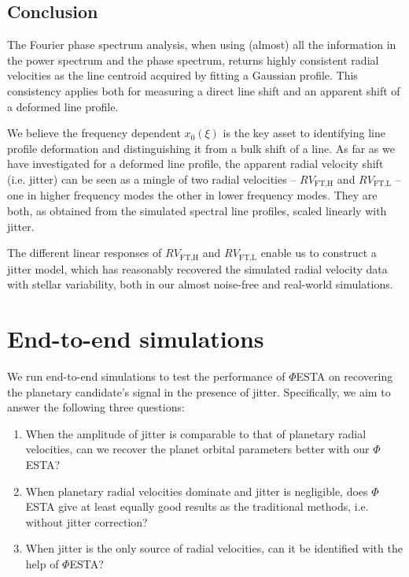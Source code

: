 \subsection{Conclusion}

The Fourier phase spectrum analysis, when using (almost) all the information in the power spectrum and the phase spectrum, returns highly consistent radial velocities as the line centroid acquired by fitting a Gaussian profile. This consistency applies both for measuring a direct line shift and an apparent shift of a deformed line profile. 

We believe the frequency dependent $x_0(\xi)$ is the key asset to identifying line profile deformation and distinguishing it from a bulk shift of a line. As far as we have investigated for a deformed line profile, the apparent radial velocity shift (i.e. jitter) can be seen as a mingle of two radial velocities -- $RV_\text{FT,H}$ and $RV_\text{FT,L}$ -- one in higher frequency modes the other in lower frequency modes. They are both, as obtained from the simulated spectral line profiles, scaled linearly with jitter. 

The different linear responses of $RV_\text{FT,H}$ and $RV_\text{FT,L}$ enable us to construct a jitter model, which has reasonably recovered the simulated radial velocity data with stellar variability, both in our almost noise-free and real-world simulations. 

\pagebreak
\section{End-to-end simulations}
\label{\thesection}
\label{sec:end-to-end}

We run end-to-end simulations to test the performance of $\mathit{\Phi}$ESTA on recovering the planetary candidate's signal in the presence of jitter. Specifically, we aim to answer the following three questions:
\begin{enumerate}
	\item When the amplitude of jitter is comparable to that of planetary radial velocities, can we recover the planet orbital parameters better with our $\mathit{\Phi}$ESTA? 
	\item When planetary radial velocities dominate and jitter is negligible, does $\mathit{\Phi}$ESTA give at least equally good results as the traditional methods, i.e. without jitter correction? 
	\item When jitter is the only source of radial velocities, can it be identified with the help of $\mathit{\Phi}$ESTA?
\end{enumerate}

